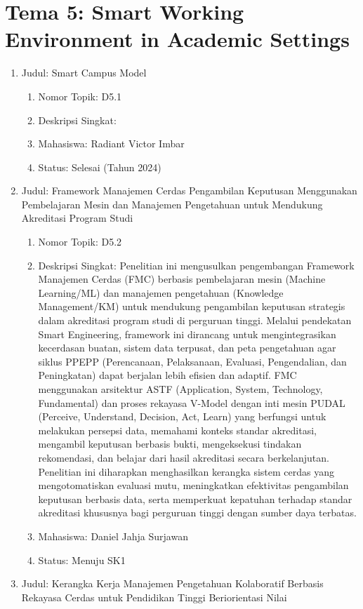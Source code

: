 \documentclass[
  letterpaper,
  DIV=11,
  numbers=noendperiod]{scrreprt}
\providecommand{\tightlist}{%
  \setlength{\itemsep}{0pt}\setlength{\parskip}{0pt}}
\begin{document}
\section{Tema 5: Smart Working Environment in Academic
Settings}\label{tema-5-smart-working-environment-in-academic-settings}

\begin{enumerate}
\def\labelenumi{\arabic{enumi}.}
\tightlist
\item
  Judul: Smart Campus Model

  \begin{enumerate}
  \def\labelenumii{\arabic{enumii}.}
  \tightlist
  \item
    Nomor Topik: D5.1
  \item
    Deskripsi Singkat:
  \item
    Mahasiswa: Radiant Victor Imbar
  \item
    Status: Selesai (Tahun 2024)
  \end{enumerate}
\item
  Judul: Framework Manajemen Cerdas Pengambilan Keputusan Menggunakan
  Pembelajaran Mesin dan Manajemen Pengetahuan untuk Mendukung
  Akreditasi Program Studi

  \begin{enumerate}
  \def\labelenumii{\arabic{enumii}.}
  \tightlist
  \item
    Nomor Topik: D5.2
  \item
    Deskripsi Singkat: Penelitian ini mengusulkan pengembangan Framework
    Manajemen Cerdas (FMC) berbasis pembelajaran mesin (Machine
    Learning/ML) dan manajemen pengetahuan (Knowledge Management/KM)
    untuk mendukung pengambilan keputusan strategis dalam akreditasi
    program studi di perguruan tinggi. Melalui pendekatan Smart
    Engineering, framework ini dirancang untuk mengintegrasikan
    kecerdasan buatan, sistem data terpusat, dan peta pengetahuan agar
    siklus PPEPP (Perencanaan, Pelaksanaan, Evaluasi, Pengendalian, dan
    Peningkatan) dapat berjalan lebih efisien dan adaptif. FMC
    menggunakan arsitektur ASTF (Application, System, Technology,
    Fundamental) dan proses rekayasa V-Model dengan inti mesin PUDAL
    (Perceive, Understand, Decision, Act, Learn) yang berfungsi untuk
    melakukan persepsi data, memahami konteks standar akreditasi,
    mengambil keputusan berbasis bukti, mengeksekusi tindakan
    rekomendasi, dan belajar dari hasil akreditasi secara berkelanjutan.
    Penelitian ini diharapkan menghasilkan kerangka sistem cerdas yang
    mengotomatiskan evaluasi mutu, meningkatkan efektivitas pengambilan
    keputusan berbasis data, serta memperkuat kepatuhan terhadap standar
    akreditasi khususnya bagi perguruan tinggi dengan sumber daya
    terbatas.
  \item
    Mahasiswa: Daniel Jahja Surjawan
  \item
    Status: Menuju SK1
  \end{enumerate}
\item
  Judul: Kerangka Kerja Manajemen Pengetahuan Kolaboratif Berbasis
  Rekayasa Cerdas untuk Pendidikan Tinggi Beriorientasi Nilai


\end{enumerate}
\end{document}
